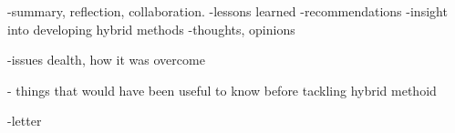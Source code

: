 

-summary, reflection, collaboration.
-lessons learned
-recommendations
-insight into developing hybrid methods
-thoughts, opinions

-issues dealth, how it was overcome

- things that would have been useful to know before tackling hybrid methoid


-letter